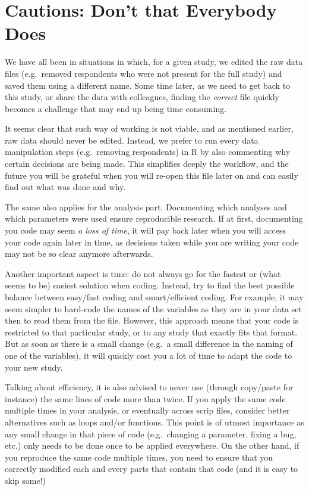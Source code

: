 \documentclass[
]{krantz}
\begin{document}
\hypertarget{cautions-dont-that-everybody-does}{%
\section{Cautions: Don't that Everybody Does}\label{cautions-dont-that-everybody-does}}

We have all been in situations in which, for a given study, we edited the raw data files (e.g.~removed respondents who were not present for the full study) and saved them using a different name. Some time later, as we need to get back to this study, or share the data with colleagues, finding the \emph{correct} file quickly becomes a challenge that may end up being time consuming.

It seems clear that such way of working is not viable, and as mentioned earlier, raw data should never be edited. Instead, we prefer to run every data manipulation steps (e.g.~removing respondents) in R by also commenting why certain decisions are being made. This simplifies deeply the workflow, and the future you will be grateful when you will re-open this file later on and can easily find out what was done and why.

The same also applies for the analysis part. Documenting which analyses and which parameters were used ensure reproducible research. If at first, documenting you code may seem \emph{a loss of time}, it will pay back later when you will access your code again later in time, as decisions taken while you are writing your code may not be so clear anymore afterwards.

Another important aspect is time: do not always go for the fastest or (what seems to be) easiest solution when coding. Instead, try to find the best possible balance between easy/fast coding and smart/efficient coding. For example, it may seem simpler to hard-code the names of the variables as they are in your data set then to read them from the file. However, this approach means that your code is restricted to that particular study, or to any study that exactly fits that format. But as soon as there is a small change (e.g.~a small difference in the naming of one of the variables), it will quickly cost you a lot of time to adapt the code to your new study.

Talking about efficiency, it is also advised to never use (through copy/paste for instance) the same lines of code more than twice. If you apply the same code multiple times in your analysis, or eventually across scrip files, consider better alternatives such as loops and/or functions. This point is of utmost importance as any small change in that piece of code (e.g.~changing a parameter, fixing a bug, etc.) only needs to be done once to be applied everywhere. On the other hand, if you reproduce the same code multiple times, you need to ensure that you correctly modified each and every parts that contain that code (and it is easy to skip some!)
\end{document}
